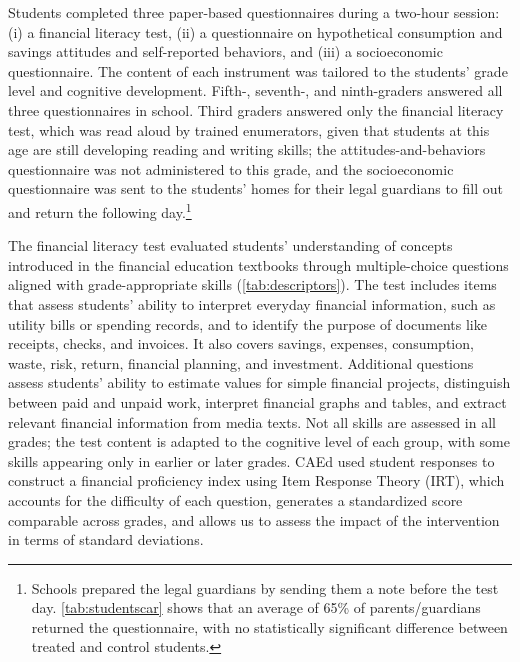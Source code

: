 Students completed three paper-based questionnaires during a two-hour session: (i) a financial literacy test, (ii) a questionnaire on hypothetical consumption and savings attitudes and self-reported behaviors, and (iii) a socioeconomic questionnaire. The content of each instrument was tailored to the students’ grade level and cognitive development. Fifth-, seventh-, and ninth-graders answered all three questionnaires in school. Third graders answered only the financial literacy test, which was read aloud by trained enumerators, given that students at this age are still developing reading and writing skills; the attitudes-and-behaviors questionnaire was not administered to this grade, and the socioeconomic questionnaire was sent to the students' homes for their legal guardians to fill out and return the following day.\footnote{Schools prepared the legal guardians by sending them a note before the test day. \autoref{tab:studentscar} shows that an average of 65\% of parents/guardians returned the questionnaire, with no statistically significant difference between treated and control students.}

The financial literacy test evaluated students’ understanding of concepts introduced in the financial education textbooks through multiple-choice questions aligned with grade-appropriate skills (\autoref{tab:descriptors}). The test includes items that assess students’ ability to interpret everyday financial information, such as utility bills or spending records, and to identify the purpose of documents like receipts, checks, and invoices. It also covers savings, expenses, consumption, waste, risk, return, financial planning, and investment. Additional questions assess students’ ability to estimate values for simple financial projects, distinguish between paid and unpaid work, interpret financial graphs and tables, and extract relevant financial information from media texts. Not all skills are assessed in all grades; the test content is adapted to the cognitive level of each group, with some skills appearing only in earlier or later grades. CAEd used student responses to construct a financial proficiency index using Item Response Theory (IRT), which accounts for the difficulty of each question, generates a standardized score comparable across grades, and allows us to assess the impact of the intervention in terms of standard deviations.

